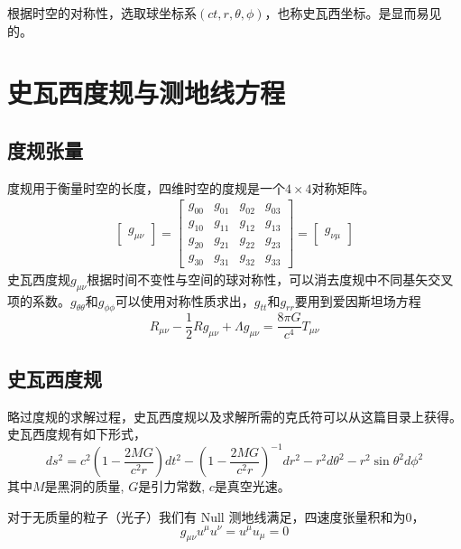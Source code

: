 根据时空的对称性，选取球坐标系$\left(ct,r,\theta,\phi\right)$，也称史瓦西坐标。是显而易见的。


\section{史瓦西度规与测地线方程}
\subsection{度规张量}
度规用于衡量时空的长度，四维时空的度规是一个$4\times4$对称矩阵。
\begin{equation}
    \begin{split}
        \begin{bmatrix}g_{\mu\nu}\end{bmatrix}=\begin{bmatrix}g_{00} & g_{01} & g_{02} & g_{03} \\
            g_{10} & g_{11} & g_{12} & g_{13} \\
            g_{20} & g_{21} & g_{22} & g_{23} \\
            g_{30} & g_{31} & g_{32} & g_{33}
        \end{bmatrix}=\begin{bmatrix}g_{\nu\mu}\end{bmatrix}
    \end{split}
\end{equation}
史瓦西度规$g_{\mu\nu}$根据时间不变性与空间的球对称性，可以消去度规中不同基矢交叉项的系数。$g_{\theta\theta}$和$g_{\phi\phi}$可以使用对称性质求出，$g_{tt}$和$g_{rr}$要用到爱因斯坦场方程
\begin{equation}
    R_{\mu\nu}-\frac{1}{2}Rg_{\mu\nu}+\Lambda g_{\mu\nu}=\frac{8\pi G}{c^{4}}T_{\mu\nu}
\end{equation}

\subsection{史瓦西度规}
略过度规的求解过程，史瓦西度规以及求解所需的克氏符可以从这篇目录\cite{mueller_catalogue_2010}上获得。
史瓦西度规有如下形式，
\begin{equation}
    ds^{2}=c^{2}\left(1-\frac{2MG}{c^{2}r}\right)dt^{2}-\left(1-\frac{2MG}{c^{2}r}\right)^{-1}dr^{2}-r^{2}d\theta^{2}-r^{2}\sin\theta^{2}d\phi^{2}
\end{equation}
其中$M$是黑洞的质量, $G$是引力常数, $c$是真空光速。

对于无质量的粒子（光子）我们有 Null 测地线满足，四速度张量积和为0，
\begin{equation}
    g_{\mu\nu}u^{\mu}u^{\nu}=u^{\mu}u_{\mu}=0
\end{equation}

